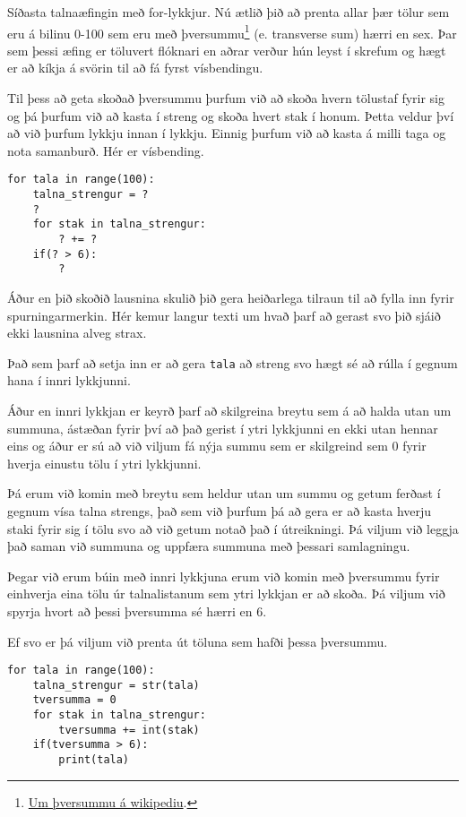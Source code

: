 \begin{exercise}\label{lyk4}
Síðasta talnaæfingin með for-lykkjur.
Nú ætlið þið að prenta allar þær tölur sem eru á bilinu 0-100 sem eru með þversummu\footnote{\href{https://is.wikipedia.org/wiki/\%C3\%9Eversumma}{Um þversummu á wikipediu}.} (e. transverse sum) hærri en sex.
Þar sem þessi æfing er töluvert flóknari en aðrar verður hún leyst í skrefum og hægt er að kíkja á svörin til að fá fyrst vísbendingu.
\end{exercise}
\begin{Answer}[ref={lyk4}]
Til þess að geta skoðað þversummu þurfum við að skoða hvern tölustaf fyrir sig og þá þurfum við að kasta í streng og skoða hvert stak í honum.
Þetta veldur því að við þurfum lykkju innan í lykkju.
Einnig þurfum við að kasta á milli taga og nota samanburð.
Hér er vísbending.
\begin{lstlisting}
for tala in range(100):
	talna_strengur = ?
	?
	for stak in talna_strengur:
		? += ?
	if(? > 6):
		?
\end{lstlisting}

Áður en þið skoðið lausnina skulið þið gera heiðarlega tilraun til að fylla inn fyrir spurningarmerkin.
Hér kemur langur texti um hvað þarf að gerast svo þið sjáið ekki lausnina alveg strax.

Það sem þarf að setja inn er að gera \texttt{tala} að streng svo hægt sé að rúlla í gegnum hana í innri lykkjunni.

Áður en innri lykkjan er keyrð þarf að skilgreina breytu sem á að halda utan um summuna, ástæðan fyrir því að það gerist í ytri lykkjunni en ekki utan hennar eins og áður er sú að við viljum fá nýja summu sem er skilgreind sem 0 fyrir hverja einustu tölu í ytri lykkjunni.

Þá erum við komin með breytu sem heldur utan um summu og getum ferðast í gegnum vísa talna strengs, það sem við þurfum þá að gera er að kasta hverju staki fyrir sig í tölu svo að við getum notað það í útreikningi.
Þá viljum við leggja það saman við summuna og uppfæra summuna með þessari samlagningu.

Þegar við erum búin með innri lykkjuna erum við komin með þversummu fyrir einhverja eina tölu úr talnalistanum sem ytri lykkjan er að skoða.
Þá viljum við spyrja hvort að þessi þversumma sé hærri en 6.

Ef svo er þá viljum við prenta út töluna sem hafði þessa þversummu.

\begin{lstlisting}
for tala in range(100):
	talna_strengur = str(tala)
	tversumma = 0
	for stak in talna_strengur:
		tversumma += int(stak)
	if(tversumma > 6):
		print(tala)\end{lstlisting}
\end{Answer}

